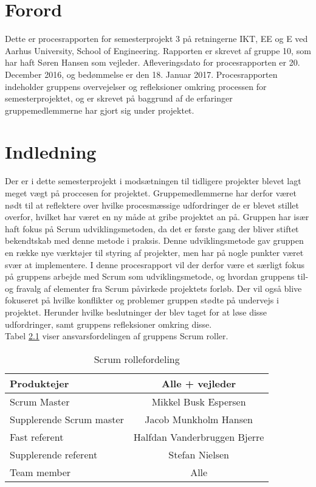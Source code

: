 \chapter{Forord}
Dette er procesrapporten for semesterprojekt 3 på retningerne IKT, EE og E ved Aarhus University, School of Engineering. Rapporten er skrevet af gruppe 10, som har haft Søren Hansen som vejleder. Afleveringsdato for procesrapporten er 20. December 2016, og bedømmelse er den 18. Januar 2017. Procesrapporten indeholder gruppens overvejelser og refleksioner omkring processen for semesterprojektet, og er skrevet på baggrund af de erfaringer gruppemedlemmerne har gjort sig under projektet.    

\chapter{Indledning}
Der er i dette semesterprojekt i modsætningen til tidligere projekter blevet lagt meget vægt på proccesen for projektet. Gruppemedlemmerne har derfor været nødt til at reflektere over hvilke procesmæssige udfordringer de er blevet stillet overfor, hvilket har været en ny måde at gribe projektet an på. Gruppen har især haft fokus på Scrum udviklingsmetoden, da det er første gang der bliver stiftet bekendtskab med denne metode i praksis. Denne udviklingsmetode gav gruppen en række nye værktøjer til styring af projekter, men har på nogle punkter været svær at implementere. I denne procesrapport vil der derfor være et særligt fokus på gruppens arbejde med Scrum som udviklingsmetode, og hvordan gruppens til- og fravalg af elementer fra Scrum påvirkede projektets forløb. Der vil også blive fokuseret på hvilke konflikter og problemer gruppen stødte på undervejs i projektet. Herunder hvilke beslutninger der blev taget for at løse disse udfordringer, samt gruppens refleksioner omkring disse.
\\
Tabel \ref{roller} viser ansvarsfordelingen af gruppens Scrum roller. \\

\begin{table}
	\centering
	\begin{tabular}{| l | c |}
		\hline
		Produktejer & Alle + vejleder\\
		\hline
		Scrum Master & Mikkel Busk Espersen\\
		\hline
		Supplerende Scrum master & Jacob Munkholm Hansen\\
		\hline
		Fast referent & Halfdan Vanderbruggen Bjerre\\
		\hline
		Supplerende referent & Stefan Nielsen\\
		\hline
		Team member & Alle\\
		\hline
	\end{tabular}
	\caption{Scrum rollefordeling}
	\label{roller}
\end{table}

